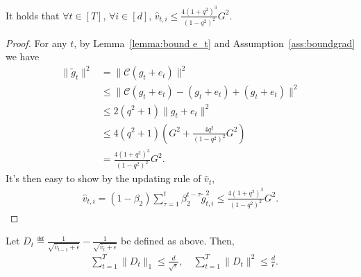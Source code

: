 \documentclass[11pt]{article}
\begin{document}
\begin{Lemma} \label{lemma:bound v_t}
It holds that $\forall t\in [T]$, $\forall i\in [d]$, $\hat v_{t,i}\leq \frac{4(1+q^2)^3}{(1-q^2)^2}G^2$.

\end{Lemma}

\begin{proof}
For any $t$, by Lemma~\ref{lemma:bound e_t} and Assumption~\ref{ass:boundgrad} we have
\begin{align*}
    \|\tilde g_t\|^2&=\|\mathcal C(g_t+e_t)\|^2\\
    &\leq \|\mathcal C(g_t+e_t)-(g_t+e_t)+(g_t+e_t)\|^2\\
    &\leq 2(q^2+1)\|g_t+e_t\|^2\\
    &\leq 4(q^2+1)(G^2+\frac{4q^2}{(1-q^2)^2}G^2)\\
    &=\frac{4(1+q^2)^3}{(1-q^2)^2}G^2.
\end{align*}
It's then easy to show by the updating rule of $\hat v_t$,
\begin{align*}
    \hat v_{t,i}=(1-\beta_2)\sum_{\tau=1}^t \beta_2^{t-\tau} \tilde g_{t,i}^2\leq \frac{4(1+q^2)^3}{(1-q^2)^2}G^2.
\end{align*}

\end{proof}


\begin{Lemma}  \label{lemma:bound difference}
Let $D_t\eqdef \frac{1}{\sqrt{\hat v_{t-1}+\epsilon}}-\frac{1}{\sqrt{\hat v_t+\epsilon}}$ be defined as above. Then,
\begin{align*}
    &\sum_{t=1}^T \|D_t\|_1 \leq \frac{d}{\sqrt\epsilon},\quad  \sum_{t=1}^T \|D_t\|^2 \leq \frac{d}{\epsilon}.
\end{align*}
\end{Lemma}
\end{document}
